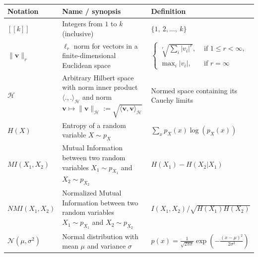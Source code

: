 \documentclass[nobib, a4paper, notoc, twoside, justified, openany]{tufte-book}
\providecommand{\B}[1]{\mathbf{#1}}
\def\v{\mathbf{v}}
\begin{document}
\begin{fullwidth}
\def\arraystretch{1.5}
\begin{longtable}{p{3cm} | p{6cm} | p{7.5cm}}
\cmidrule{1-3}
Notation & Name / synopsis & Definition\\ 
  \midrule
  $[\![k]\!]$ & Integers from $1$ to $k$ (inclusive) & $\{1,~2, \ldots,~k \}$ \\
  $\| \B{v} \|_r$ & $\ell_r$ norm for vectors in  a finite-dimensional Euclidean space & $\begin{cases}\sqrt[r]{\sum_i |v_i|^r},&\mbox{ if }1 \le r < \infty,\\\max_{i}|v_i|,&\mbox { if }r = \infty\end{cases}$ \\
  $\mathcal H$ & Arbitrary Hilbert space with norm inner product $\langle .,.\rangle_{\mathcal H}$ and norm $\v \mapsto \|\v\|_{\mathcal H} := \sqrt{\langle \v,\v\rangle_{\mathcal H}}$& Normed space containing its Cauchy limits\\
$H(X)$ & Entropy of a random variable $X \sim p_X$ & $\sum_{x}p_{X}(x)\log(p_{X}(x))$\\
$MI(X_1,X_2)$ & Mutual Information between two random variables $X_1 \sim p_{X_1}$ and $X_2 \sim p_{X_2}$ & 
$ H(X_1) - H(X_2|X_1)$\\

 $NMI(X_1,X_2)$ & Normalized Mutual Information between two random variables $X_1 \sim p_{X_1}$ and $X_2 \sim p_{X_2}$ & $I(X_1,X_2)/\sqrt{H(X_1)H(X_2)}$ \\
  $\mathcal{N}(\mu, \sigma^2)$ & Normal distribution with mean $\mu$ and variance $\sigma$ & $p(x) = \frac{1}{\sqrt{2\pi\sigma}}
                                                                                             \exp\left(-\frac{(x-\mu)^2}{2\sigma^2}\right)$\\


\end{longtable}
\end{fullwidth}
\end{document}
